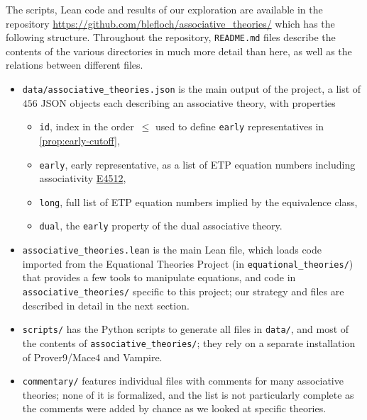 \documentclass[12pt]{amsart}
\theoremstyle{plain}
\theoremstyle{definition}
\newcommand{\Equaref}[1]{\href{https://teorth.github.io/equational_theories/implications/?#1}{\textrm{\textup{E}}#1}}
\begin{document}
The scripts, Lean code and results of our exploration are available in the repository \url{https://github.com/blefloch/associative_theories/} which has the following structure.  Throughout the repository, \texttt{README.md} files describe the contents of the various directories in much more detail than here, as well as the relations between different files.

\begin{itemize}
\item \texttt{data/associative\_theories.json} is the main output of the project, a list of $456$ JSON objects each describing an associative theory, with properties
  \begin{itemize}
  \item \texttt{id}, index in the order~$\leq$ used to define
    \texttt{early} representatives in \autoref{prop:early-cutoff},
  \item \texttt{early}, early representative, as a list of ETP equation
    numbers including associativity \Equaref{4512},
  \item \texttt{long}, full list of ETP equation numbers implied by the
    equivalence class,
  \item \texttt{dual}, the \texttt{early} property of the dual
    associative theory.
  \end{itemize}

\item \texttt{associative\_theories.lean} is the main Lean file, which loads code imported from the Equational Theories Project (in \texttt{equational\_\allowbreak theories/}) that provides a few tools to manipulate equations, and code in \texttt{associative\_theories/} specific to this project; our strategy and files are described in detail in the next section.

\item \texttt{scripts/} has the Python scripts to generate all files in \texttt{data/}, and most of the contents of \texttt{associative\_theories/}; they rely on a separate installation of Prover9/Mace4 and Vampire.

\item \texttt{commentary/} features individual files with comments for many associative theories; none of it is formalized, and the list is not particularly complete as the comments were added by chance as we looked at specific theories.
\end{itemize}
\end{document}
